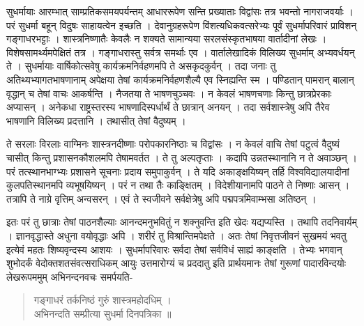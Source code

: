 सुधर्मायाः आरम्भात् साम्प्रतिकसमयपर्यन्तम् आधाररूपेण सन्ति प्रख्याताः विद्वांसः तत्र भवन्तो नागराजवर्याः । परं सुधर्मा बहून् विदुषः साहायत्वेन इच्छति । देवानुग्रहरूपेण विंशत्यधिकवत्सरेभ्यः पूर्वं सुधर्मापरिवारं प्राविशन् गङ्गाधरभट्टाः । शास्त्रनिष्णातैः केवलैः न शक्यते सामान्यया सरलसंस्कृतभाषया वार्तादीनां लेखः । विशेषसामर्थ्यमपेक्षितं तत्र । गङ्गाधरास्तु सर्वत्र समर्थाः एव । वार्तालेखादिकं विलिख्य सुधर्माम् अभ्यवर्धयन् ते । सुधर्मायाः वार्षिकोत्सवेषु कार्यक्रमनिर्वहणमपि ते असकृदकुर्वन् । तदा जनाः तु अतिथ्यभ्यागतभाषणानाम् अपेक्षया तेषां कार्यक्रमनिर्वहणशैल्यै एव स्निह्यन्ति स्म । पण्डितान् पामरान् बालान् वृद्धान् च तेषां वाचः आकर्षन्ति । नैजतया ते भाषणचुञ्चवः । न केवलं भाषणचणाः किन्तु छात्रप्रेरकाः अप्यासन् । अनेकधा राष्ट्रस्तरस्य भाषणादिस्पर्धार्थं ते छात्रान् अनयन् । तदा सर्वशास्त्रेषु अपि तैरेव भाषणानि विलिख्य प्रदत्तानि । तथासीत् तेषां वैदुष्यम् । 

ते सरलाः विरलाः वाग्मिनः शास्त्रनदीष्णाः परोपकारनिष्ठाः च विद्वांसः । न केवलं वाचि तेषां पटुत्वं वैदुष्यं चासीत् किन्तु प्रशासनकौशलमपि तेषामवर्तत । ते तु अल्पतृप्ताः । कदापि उन्नतस्थानानि न ते अवाञ्छन् । परं तत्स्थानभाग्भ्यः प्रशासने सूचनाः प्रदाय समुपाकुर्वन् । ते यदि अकाङ्क्षयिष्यन् तर्हि विश्वविद्यालयादीनां कुलपतिस्थानमपि व्यभूषयिष्यन् । परं न तथा तैः काङ्क्षितम् । विदेशीयानामपि पाठने ते निष्णाः आसन् । तत्रापि ते नाग्रे वृत्तिम् अन्वसरन् । एवं ते स्वजीवने सर्वक्षेत्रेषु अपि पद्मपत्रमिवाम्भसा अतिष्ठन् । 

इतः परं तु छात्राः तेषां पाठनशैल्याः आनन्दमनुभवितुं न शक्नुवन्ति इति खेदः यद्यप्यस्ति । तथापि तदनिवार्यम् । ज्ञानवृद्धास्ते अधुना वयोवृद्धाः अपि । शरीरं तु विश्रान्तिमपेक्षते । अतः तेषां निवृत्तजीवनं सुखमयं भवतु इत्येवं महतः शिष्यवृन्दस्य आशयः । सुधर्मापरिवारः सर्वदा तेषां सर्वविधं साह्यं काङ्क्षति । तेभ्यः भगवान् शुभोदर्कं वेदोक्तशतसंवत्सराधिकम् आयुः उत्तमारोग्यं च प्रददातु इति प्रार्थयमानः तेषां गुरूणां पादारविन्दयोः लेखरूपममुम् अभिनन्दनवचः समर्पयति-

\begin{verse}
गङ्गाधरं तर्कनिष्ठं गुरुं शास्त्रमहोदधिम् ।\\
अभिनन्दति सम्प्रीत्या सुधर्मा दिनपत्रिका ॥
\end{verse}

